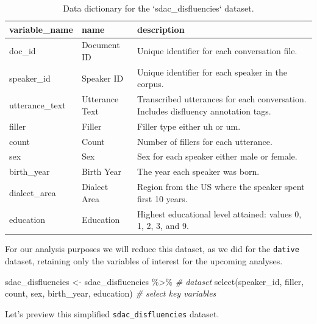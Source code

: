 \documentclass[
]{article}
\newenvironment{Shaded}{\begin{snugshade}}{\end{snugshade}}
\newcommand{\CommentTok}[1]{\textcolor[rgb]{0.56,0.35,0.01}{\textit{#1}}}
\newcommand{\FunctionTok}[1]{\textcolor[rgb]{0.00,0.00,0.00}{#1}}
\newcommand{\NormalTok}[1]{#1}
\newcommand{\OtherTok}[1]{\textcolor[rgb]{0.56,0.35,0.01}{#1}}
\newcommand{\SpecialCharTok}[1]{\textcolor[rgb]{0.00,0.00,0.00}{#1}}
\begin{document}
\begin{table}

\caption{\label{tab:i-sdac-disfluencies-dictionary}Data dictionary for the `sdac_disfluencies` dataset.}
\centering
\begin{tabular}[t]{lll}
\toprule
variable\_name & name & description\\
\midrule
doc\_id & Document ID & Unique identifier for each conversation file.\\
speaker\_id & Speaker ID & Unique identifier for each speaker in the corpus.\\
utterance\_text & Utterance Text & Transcribed utterances for each conversation. Includes disfluency annotation tags.\\
filler & Filler & Filler type either uh or um.\\
count & Count & Number of fillers for each utterance.\\
\addlinespace
sex & Sex & Sex for each speaker either male or female.\\
birth\_year & Birth Year & The year each speaker was born.\\
dialect\_area & Dialect Area & Region from the US where the speaker spent first 10 years.\\
education & Education & Highest educational level attained: values 0, 1, 2, 3, and 9.\\
\bottomrule
\end{tabular}
\end{table}

For our analysis purposes we will reduce this dataset, as we did for the \texttt{dative} dataset, retaining only the variables of interest for the upcoming analyses.

\begin{Shaded}
\begin{Highlighting}[]
\NormalTok{sdac\_disfluencies }\OtherTok{\textless{}{-}} 
\NormalTok{  sdac\_disfluencies }\SpecialCharTok{\%\textgreater{}\%} \CommentTok{\# dataset}
  \FunctionTok{select}\NormalTok{(speaker\_id, filler, count, sex, birth\_year, education) }\CommentTok{\# select key variables}
\end{Highlighting}
\end{Shaded}

Let's preview this simplified \texttt{sdac\_disfluencies} dataset.
\end{document}
